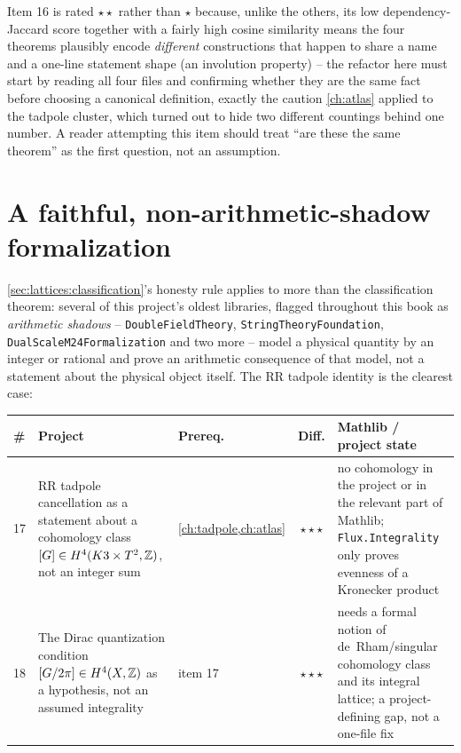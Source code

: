 Item 16 is rated $\star\star$ rather than $\star$ because, unlike the others, its
low dependency-Jaccard score together with a fairly high cosine similarity means the four
theorems plausibly encode \emph{different} constructions that happen to share a name and a
one-line statement shape (an involution property) -- the refactor here must start by
reading all four  files and confirming whether they are the same fact before
choosing a canonical definition, exactly the caution \cref{ch:atlas} applied to the tadpole
cluster, which turned out to hide two different countings behind one number. A reader
attempting this item should treat ``are these the same theorem'' as the first question,
not an assumption.

\section{A faithful, non-arithmetic-shadow formalization}\label{sec:open:shadow}

\cref{sec:lattices:classification}'s honesty rule applies to more than the classification
theorem: several of this project's oldest libraries, flagged throughout this book as
\emph{arithmetic shadows} -- \texttt{DoubleFieldTheory}, \texttt{StringTheoryFoundation},
\texttt{DualScaleM24\-Formalization} and two more -- model a physical quantity by an
integer or rational and prove an arithmetic consequence of that model, not a statement
about the physical object itself. The RR tadpole identity is the clearest case:

\begin{center}\small
\begin{tabular}{@{}p{0.6cm}p{5.4cm}p{1.7cm}cp{4.6cm}@{}}\toprule
\# & Project & Prereq. & Diff. & Mathlib / project state \\ \midrule
17 & RR tadpole cancellation as a statement about a cohomology class $[G]\in H^4(K3\times T^2,\mathbb{Z})$, not an integer sum & \cref{ch:tadpole,ch:atlas} & $\star\star\star$ & no cohomology in the project or in the relevant part of Mathlib; \texttt{Flux.Integrality} only proves evenness of a Kronecker product \\
18 & The Dirac quantization condition $[G/2\pi]\in H^4(X,\mathbb{Z})$ as a hypothesis, not an assumed integrality & item 17 & $\star\star\star$ & needs a formal notion of de~Rham/singular cohomology class and its integral lattice; a project-defining gap, not a one-file fix \\
\bottomrule\end{tabular}
\end{center}

